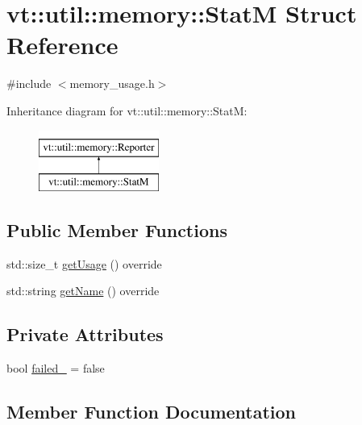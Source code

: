 \hypertarget{structvt_1_1util_1_1memory_1_1_stat_m}{}\section{vt\+:\+:util\+:\+:memory\+:\+:StatM Struct Reference}
\label{structvt_1_1util_1_1memory_1_1_stat_m}


{\ttfamily \#include $<$memory\+\_\+usage.\+h$>$}

Inheritance diagram for vt\+:\+:util\+:\+:memory\+:\+:StatM\+:\begin{figure}[H]
\begin{center}
\leavevmode
\includegraphics[height=2.000000cm]{structvt_1_1util_1_1memory_1_1_stat_m}
\end{center}
\end{figure}
\subsection*{Public Member Functions}
\begin{DoxyCompactItemize}
\item 
std\+::size\+\_\+t \hyperlink{structvt_1_1util_1_1memory_1_1_stat_m_a066c740a52e05e7184dfff530ed07173}{get\+Usage} () override
\item 
std\+::string \hyperlink{structvt_1_1util_1_1memory_1_1_stat_m_ad8ea55e89ec3c591348a26b670048814}{get\+Name} () override
\end{DoxyCompactItemize}
\subsection*{Private Attributes}
\begin{DoxyCompactItemize}
\item 
bool \hyperlink{structvt_1_1util_1_1memory_1_1_stat_m_a9c268c769506493be2a98ea4e6e553ff}{failed\+\_\+} = false
\end{DoxyCompactItemize}


\subsection{Member Function Documentation}
\mbox{\label{structvt_1_1util_1_1memory_1_1_stat_m_ad8ea55e89ec3c591348a26b670048814}} 
